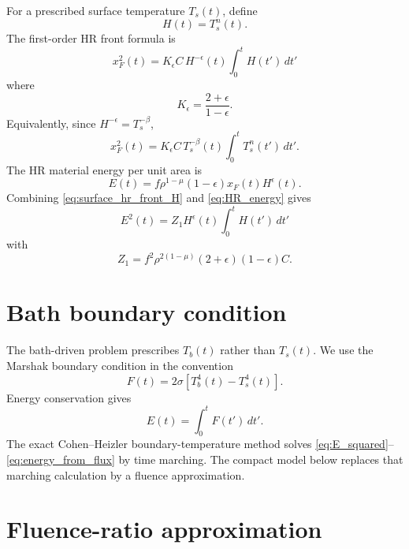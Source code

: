 \documentclass[11pt]{article}
\newcommand{\Tb}{T_b}
\newcommand{\Ts}{T_s}
\newcommand{\xf}{x_F}
\newcommand{\eps}{\epsilon}
\newcommand{\dif}{\,d}
\begin{document}
For a prescribed surface temperature $\Ts(t)$, define
\begin{equation}
 H(t)=\Ts^n(t).
\end{equation}
The first-order HR front formula is
\begin{equation}
 \boxed{
 \xf^2(t)=K_\eps C\,H^{-\eps}(t)\int_0^t H(t')\dif t'}
 \label{eq:surface_hr_front_H}
\end{equation}
where
\begin{equation}
 \boxed{K_\eps=\frac{2+\eps}{1-\eps}.}
 \label{eq:Keps}
\end{equation}
Equivalently, since $H^{-\eps}=\Ts^{-\beta}$,
\begin{equation}
 \boxed{
 \xf^2(t)=K_\eps C\,\Ts^{-\beta}(t)
 \int_0^t \Ts^n(t')\dif t'.}
 \label{eq:surface_hr_front_T}
\end{equation}
The HR material energy per unit area is
\begin{equation}
 \boxed{
 E(t)=f\rho^{1-\mu}(1-\eps)\xf(t)H^\eps(t).}
 \label{eq:HR_energy}
\end{equation}
Combining \eqref{eq:surface_hr_front_H} and \eqref{eq:HR_energy} gives
\begin{equation}
 \boxed{
 E^2(t)=Z_1H^\eps(t)\int_0^tH(t')\dif t'}
 \label{eq:E_squared}
\end{equation}
with
\begin{equation}
 \boxed{
 Z_1=f^2\rho^{2(1-\mu)}(2+\eps)(1-\eps)C.}
 \label{eq:Z1}
\end{equation}

\section{Bath boundary condition}

The bath-driven problem prescribes $\Tb(t)$ rather than $\Ts(t)$.  We use the
Marshak boundary condition in the convention
\begin{equation}
 \boxed{
 F(t)=2\sigma\left[\Tb^4(t)-\Ts^4(t)\right].}
 \label{eq:marshak}
\end{equation}
Energy conservation gives
\begin{equation}
 E(t)=\int_0^tF(t')\dif t'.
 \label{eq:energy_from_flux}
\end{equation}
The exact Cohen--Heizler boundary-temperature method solves
\eqref{eq:E_squared}--\eqref{eq:energy_from_flux} by time marching.  The compact
model below replaces that marching calculation by a fluence approximation.

\section{Fluence-ratio approximation}
\end{document}
